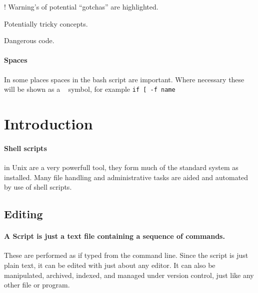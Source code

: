 \documentclass[12pt,a4paper]{article}
\begin{document}
\begin{note}{\Large !}
        Warning's of potential ``gotchas'' are
highlighted.
\end{note}

\begin{note}{\scriptsize\dbend}
        Potentially tricky concepts.
\end{note}

\begin{note}{\small\faWarning}
        Dangerous code.
\end{note}

\paragraph{Spaces} In some places spaces in the bash script are important.
Where necessary these will be shown as a \verb*| | symbol, for example
\verb*'if [ -f name'

\section{Introduction}
\paragraph{Shell scripts} in Unix are a very powerfull tool, they
form much of the standard system as installed.  Many file handling and
administrative tasks are aided and automated by use of shell scripts.

\subsection{Editing}
\paragraph{A Script is just a text file containing a sequence of
  commands.}  These are performed as if typed from the command line.
Since the script is just plain text, it can be edited with just about any
editor.  It can also be manipulated, archived, indexed, and managed under
version control,  just like any other file or program.
\end{document}
